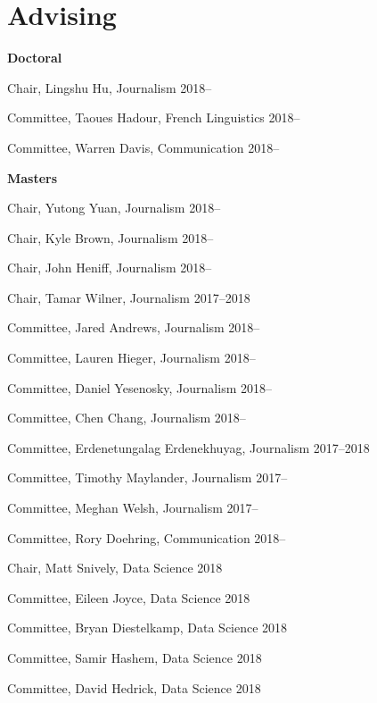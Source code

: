 
\section{Advising}

  \textbf{Doctoral}
    \begin{innerlist}
      \item Chair, Lingshu Hu, Journalism                            \hfill 2018--
      \item Committee, Taoues Hadour, French Linguistics             \hfill 2018--
      \item Committee, Warren Davis, Communication                   \hfill 2018--
    \end{innerlist}\vspace{1em}

  \textbf{Masters}
    \begin{innerlist}
      \item Chair, Yutong Yuan, Journalism                           \hfill 2018--
      \item Chair, Kyle Brown, Journalism                            \hfill 2018--
      \item Chair, John Heniff, Journalism                           \hfill 2018--
      \item Chair, Tamar Wilner, Journalism                          \hfill 2017--2018
      \item Committee, Jared Andrews, Journalism                     \hfill 2018--
      \item Committee, Lauren Hieger, Journalism                     \hfill 2018--
      \item Committee, Daniel Yesenosky, Journalism                  \hfill 2018--
      \item Committee, Chen Chang, Journalism                        \hfill 2018--
      \item Committee, Erdenetungalag Erdenekhuyag, Journalism       \hfill 2017--2018
      \item Committee, Timothy Maylander, Journalism                 \hfill 2017--
      \item Committee, Meghan Welsh, Journalism                      \hfill 2017--
      \item Committee, Rory Doehring, Communication                  \hfill 2018--
      \item Chair, Matt Snively, Data Science                        \hfill 2018
      \item Committee, Eileen Joyce, Data Science                    \hfill 2018
      \item Committee, Bryan Diestelkamp, Data Science               \hfill 2018
      \item Committee, Samir Hashem, Data Science                    \hfill 2018
      \item Committee, David Hedrick, Data Science                   \hfill 2018
    \end{innerlist}\vspace{-.1in}
